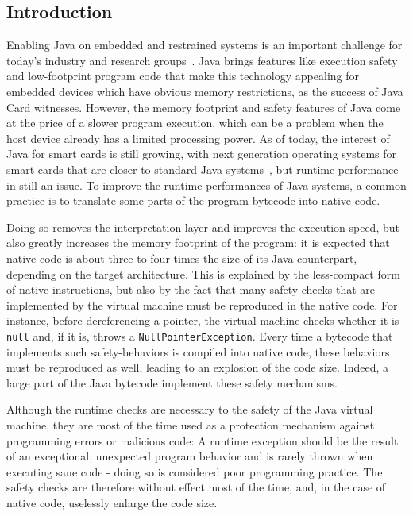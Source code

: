 \subsection{Introduction}
\label{sec:intro}

Enabling Java on embedded and restrained systems is an important challenge for today's industry and research groups~\cite{Mulchandani1998}. Java brings features like execution safety and low-footprint program code that make this technology appealing for embedded devices which have obvious memory restrictions, as the success of Java Card witnesses. However, the memory footprint and safety features of Java come at the price of a slower program execution, which can be a problem when the host device already has a limited processing power. As of today, the interest of Java for smart cards is still growing, with next generation operating systems for smart cards that are closer to standard Java systems~\cite{Lagosanto2002,Grimaud2003}, but runtime performance in still an issue. To improve the runtime performances of Java systems, a common practice is to translate some parts of the program bytecode into native code.

Doing so removes the interpretation layer and improves the execution speed, but also greatly increases the memory footprint of the program: it is expected that native code is about three to four times the size of its Java counterpart, depending on the target architecture. This is explained by the less-compact form of native instructions, but also by the fact that many safety-checks that are implemented by the virtual machine must be reproduced in the native code. For instance, before dereferencing a pointer, the virtual machine checks whether it is \texttt{null} and, if it is, throws a \texttt{NullPointerException}. Every time a bytecode that implements such safety-behaviors is compiled into native code, these behaviors must be reproduced as well, leading to an explosion of the code size. Indeed, a large part of the Java bytecode implement these safety mechanisms.

Although the runtime checks are necessary to the safety of the Java virtual machine, they are most of the time used as a protection mechanism against programming errors or malicious code: A runtime exception should be the result of an exceptional, unexpected program behavior and is rarely thrown when executing sane code - doing so is considered poor programming practice. The safety checks are therefore without effect most of the time, and, in the case of native code, uselessly enlarge the code size.

